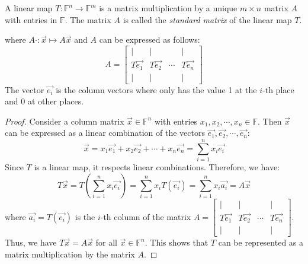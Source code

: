 \documentclass[
	11pt, %
	fleqn, %
	a4paper, %
]{LegrandOrangeBook}
\newcommand{\Hom}[2]{\text{Hom}(#1, #2)} %
\newcommand{\F}{\mathbb{F}} %
\newcommand{\M}[2]{\text{M}_{#1}(#2)} %
\begin{document}
\begin{proposition}
    A linear map $T: \F^n \to \F^m$ is a matrix multiplication by a unique $m \times n$ matrix $A$ with entries in $\F$. The matrix $A$ is called the \emph{standard matrix} of the linear map $T$.
    
    \begin{center}
    \end{center}
    where $A\cdot : \vec{x} \mapsto A\vec{x}$ and $A$ can be expressed as follows:
    \[
        A = \begin{bmatrix}
            | & | & & | \\
            T\vec{e_1} & T\vec{e_2} & \cdots & T\vec{e_n} \\
            | & | & & |
        \end{bmatrix}
    \]
    The vector $\vec{e_i}$ is the column vectors where only has the value 1 at the $i$-th place and 0 at other places.
\end{proposition}

\begin{proof}
    Consider a column matrix $\vec{x} \in \F^n$ with entries $x_1, x_2, \cdots, x_n \in \F$. Then $\vec{x}$ can be expressed as a linear combination of the vectors $\vec{e_1}, \vec{e_2}, \cdots, \vec{e_n}$:
    \[
        \vec{x} = x_1 \vec{e_1} + x_2 \vec{e_2} + \cdots + x_n \vec{e_n} = \sum_{i=1}^{n} x_i \vec{e_i}
    \]
    Since $T$ is a linear map, it respects linear combinations. Therefore, we have:
    \[
        T\vec{x} = T\left( \sum_{i=1}^{n} x_i \vec{e_i} \right) = \sum_{i=1}^{n} x_i T(\vec{e_i}) = \sum_{i=1}^{n} x_i \vec{a_i} = A\vec{x}
    \]
    where $\vec{a_i} = T(\vec{e_i})$ is the $i$-th column of the matrix $A = \begin{bmatrix}
        | & | & & | \\
        T\vec{e_1} & T\vec{e_2} & \cdots & T\vec{e_n} \\
        | & | & & |
    \end{bmatrix}$. Thus, we have $T\vec{x} = A\vec{x}$ for all $\vec{x} \in \F^n$. This shows that $T$ can be represented as a matrix multiplication by the matrix $A$.
\end{proof}
\end{document}

